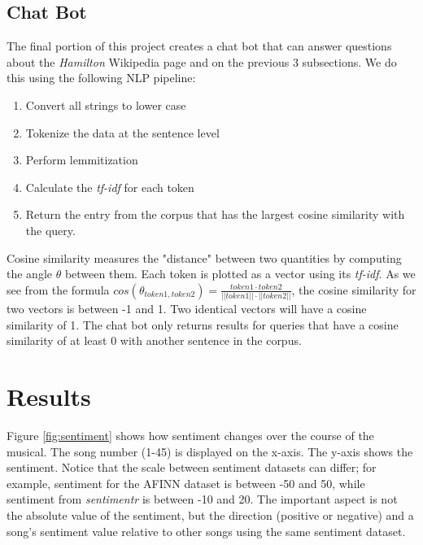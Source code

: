 \documentclass{article}
\begin{document}
\subsection{Chat Bot}

The final portion of this project creates a chat bot that can answer questions about the \emph{Hamilton} Wikipedia page and on the previous 3 subsections. We do this using the following NLP pipeline:
\begin{singlespace}
\begin{enumerate}
 \item Convert all strings to lower case
 \item Tokenize the data at the sentence level
 \item Perform lemmitization
 \item Calculate the \emph{tf-idf} for each token
 \item Return the entry from the corpus that has the largest cosine similarity with the query. 
\end{enumerate}
\end{singlespace}

Cosine similarity measures the "distance" between two quantities by computing the angle $\theta$ between them. Each token is plotted as a vector using its \emph{tf-idf}. As we see from the formula $cos(\theta_{token1, token2}) = \frac {token1 \cdot token2}{||token1|| \cdot ||token2||}$, the cosine similarity for two vectors is between -1 and 1. Two identical vectors will have a cosine similarity of 1. The chat bot only returns results for queries that have a cosine similarity of at least 0 with another sentence in the corpus. 

\section{Results}

Figure \ref{fig:sentiment} shows how sentiment changes over the course of the musical. The song number (1-45) is displayed on the x-axis. The y-axis shows the sentiment. Notice that the scale between sentiment datasets can differ; for example, sentiment for the AFINN dataset is between -50 and 50, while sentiment from \emph{sentimentr} is between -10 and 20. The important aspect is not the absolute value of the sentiment, but the direction (positive or negative) and a song's sentiment value relative to other songs using the same sentiment dataset. 
\end{document}
